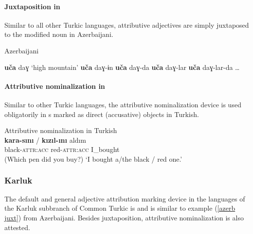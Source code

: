 \paragraph*{Juxtaposition in }
Similar to all other Turkic languages, attributive adjectives are simply juxtaposed to the modified noun in Azerbaijani.
\begin{exe}
\settowidth{}
\ex
\label{azerb juxt}
\rm{Azerbaijani \citep[59–60]{siraliev-etal1971}}
\begin{xlist}
\ex	\textbf{uča} daɣ 		\rm{‘high mountain’}	
\ex	\textbf{uča} daɣ-ɨn						
\ex	\textbf{uča} daɣ-da 						
\ex	\textbf{uča} daɣ-lar 						
\ex	\textbf{uča} daɣ-lar-da 					
\ex \dots
\end{xlist}
\end{exe}

\paragraph*{Attributive nominalization in }
\label{turkish synchr}
Similar to other Turkic languages, the attributive nominalization device is used obligatorily in s marked as direct (accusative) objects in Turkish.
\begin{exe}
\ex 
\label{turkish headless acc}	
\rm{Attributive nominalization in Turkish \citep[7]{benzing1993b}}\\ 
\gll	\textbf{kara-sını} / \textbf{kızıl-ını} aldım\\
 	black-\textsc{attr:acc} { } red-\textsc{attr:acc} I\_bought\\
\glt 	(Which pen did you buy?) ‘I bought a/the black / red one.’
\end{exe}
 
\subsubsection{Karluk}
The default and general adjective attribution marking device in the languages of the Karluk subbranch of Common Turkic is  and is similar to example (\ref{azerb juxt}) from Azerbaijani. Besides juxtaposition, attributive nominalization is also attested.

